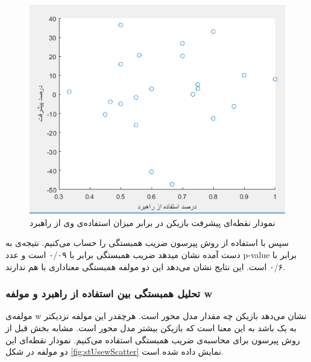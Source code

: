 \documentclass[twoside, a4paper,11pt]{book}
\numberwithin{equation}{chapter}
\numberwithin{table}{chapter}
\numberwithin{figure}{chapter}
\numberwithin{equation}{chapter}
\begin{document}
\begin{figure}
\centering
\includegraphics[scale=0.8]{Figures/impv1strUseScatter.png}
\caption{\label{fig:impv1strUseScatter}
نمودار نقطه‌ای پیشرفت بازیکن در برابر میزان استفاده‌ی وی از راهبرد
}
\end{figure}

سپس با استفاده از روش پیرسون ضریب همبستگی را حساب می‌کنیم. نتیجه‌ی به دست آمده نشان میدهد ضریب همبستگی برابر با ۰/۰۹ است و عدد p-value برابر با ۰/۶ است. این نتایج نشان می‌دهد این دو مولفه همبستگی معناداری با هم ندارند.

\subsubsection{تحلیل همبستگی بین استفاده از راهبرد و مولفه w }

مولفه‌ی w نشان می‌دهد بازیکن چه مقدار مدل محور است. هرچقدر این مولفه نزدیکتر به یک باشد به این معنا است که بازیکن بیشتر مدل محور است. مشابه بخش قبل از روش پیرسون برای محاسبه‌ی ضریب همبستگی استفاده می‌کنیم. نمودار نقطه‌ای این دو مولفه در شکل \ref{fig:stUsewScatter} نمایش داده شده است.
\end{document}
